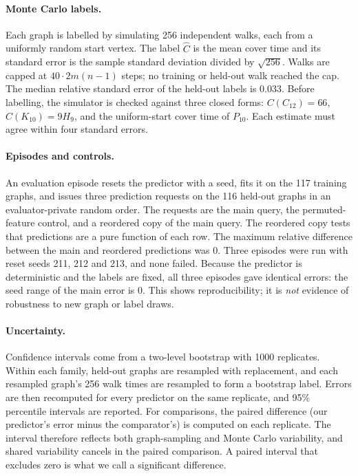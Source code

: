 \documentclass{article}
\newcommand{\Ccov}{C}
\begin{document}
\paragraph{Monte Carlo labels.} Each graph is labelled by simulating 256 independent walks, each from a uniformly random start vertex. The label $\hat\Ccov$ is the mean cover time and its standard error is the sample standard deviation divided by $\sqrt{256}$. %
Walks are capped at $40\cdot 2m(n-1)$ steps; no training or held-out walk reached the cap. The median relative standard error of the held-out labels is 0.033. %
Before labelling, the simulator is checked against three closed forms: $\Ccov(C_{12}) = 66$, $\Ccov(K_{10}) = 9H_9$, and the uniform-start cover time of $P_{10}$. Each estimate must agree within four standard errors.

\paragraph{Episodes and controls.} An evaluation episode resets the predictor with a seed, fits it on the 117 training graphs, and issues three prediction requests on the 116 held-out graphs in an evaluator-private random order. The requests are the main query, the permuted-feature control, and a reordered copy of the main query. The reordered copy tests that predictions are a pure function of each row. The maximum relative difference between the main and reordered predictions was 0. %
Three episodes were run with reset seeds 211, 212 and 213, and none failed. Because the predictor is deterministic and the labels are fixed, all three episodes gave identical errors: the seed range of the main error is 0. %
This shows reproducibility; it is \emph{not} evidence of robustness to new graph or label draws.

\paragraph{Uncertainty.} Confidence intervals come from a two-level bootstrap with 1000 replicates. Within each family, held-out graphs are resampled with replacement, and each resampled graph's 256 walk times are resampled to form a bootstrap label. Errors are then recomputed for every predictor on the same replicate, and 95\% percentile intervals are reported. For comparisons, the paired difference (our predictor's error minus the comparator's) is computed on each replicate. The interval therefore reflects both graph-sampling and Monte Carlo variability, and shared variability cancels in the paired comparison. A paired interval that excludes zero is what we call a significant difference.
\end{document}
